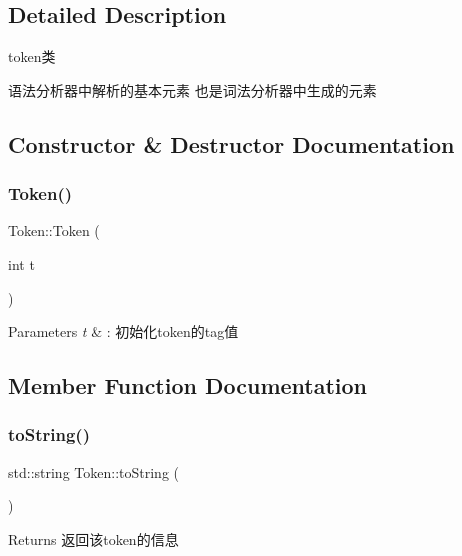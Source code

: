 \subsection{Detailed Description}
token类 

语法分析器中解析的基本元素 也是词法分析器中生成的元素 

\subsection{Constructor \& Destructor Documentation}
\mbox{\label{class_token_a29580f176bfba9981aeec62946114675}} 
\subsubsection{\texorpdfstring{Token()}{Token()}}
{\footnotesize\ttfamily Token\+::\+Token (\begin{DoxyParamCaption}\item[{int}]{t }\end{DoxyParamCaption})}


\begin{DoxyParams}{Parameters}
{\em t} & \+: 初始化token的tag值 \\
\hline
\end{DoxyParams}


\subsection{Member Function Documentation}
\mbox{\label{class_token_a8863381edabce7bc1e92473b445ba81f}} 
\subsubsection{\texorpdfstring{to\+String()}{toString()}}
{\footnotesize\ttfamily std\+::string Token\+::to\+String (\begin{DoxyParamCaption}{ }\end{DoxyParamCaption})\hspace{0.3cm}{\ttfamily [virtual]}}

\begin{DoxyReturn}{Returns}
返回该token的信息 
\end{DoxyReturn}


